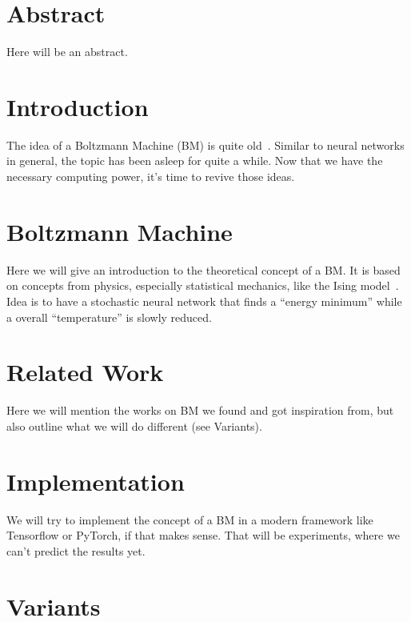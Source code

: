 \documentclass[
	12pt,
	a4paper,
	BCOR10mm,
	DIV14,
	headsepline,
	usegeometry,
]{scrreprt}
\begin{document}
\restoregeometry


\let\StandardClearpage\clearpage
\let\clearpage\relax


\tableofcontents


\chapter*{Abstract}

Here will be an abstract.


\chapter{Introduction}

The idea of a Boltzmann Machine (BM) is quite old~\cite{Ackley}. Similar to neural networks in general, the topic has been asleep for quite a while. Now that we have the necessary computing power, it's time to revive those ideas.


\chapter{Boltzmann Machine}

Here we will give an introduction to the theoretical concept of a BM. It is based on concepts from physics, especially statistical mechanics, like the Ising model~\cite{Ising}. Idea is to have a stochastic neural network that finds a ``energy minimum'' while a overall ``temperature'' is slowly reduced.


\chapter{Related Work}

Here we will mention the works on BM we found and got inspiration from, but also outline what we will do different (see Variants).


\chapter{Implementation}

We will try to implement the concept of a BM in a modern framework like Tensorflow or PyTorch, if that makes sense. That will be experiments, where we can't predict the results yet.


\chapter{Variants}
\end{document}
